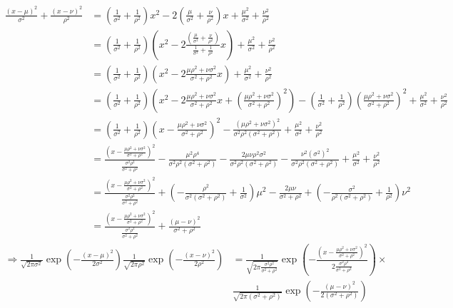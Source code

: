 \documentclass{article}
\begin{document}
\begin{pf}
\begin{align*}
\frac{(x-\mu)^2}{\sigma^2}+\frac{(x-\nu)^2}{\rho^2}&=\left(\frac{1}{\sigma^2}+\frac{1}{\rho^2}\right)x^2-2\left(\frac{\mu}{\sigma^2}+\frac{\nu}{\rho^2}\right)x+\frac{\mu^2}{\sigma^2}+\frac{\nu^2}{\rho^2}
\\&=\left(\frac{1}{\sigma^2}+\frac{1}{\rho^2}\right)\left(x^2-2\frac{\left(\frac{\mu}{\sigma^2}+\frac{\nu}{\rho^2}\right)}{\frac{1}{\sigma^2}+\frac{1}{\rho^2}}x\right)+\frac{\mu^2}{\sigma^2}+\frac{\nu^2}{\rho^2}
\\&=\left(\frac{1}{\sigma^2}+\frac{1}{\rho^2}\right)\left(x^2-2\frac{\mu\rho^2+\nu\sigma^2}{\sigma^2+\rho^2}x\right)+\frac{\mu^2}{\sigma^2}+\frac{\nu^2}{\rho^2}
\\&=\left(\frac{1}{\sigma^2}+\frac{1}{\rho^2}\right)\left(x^2-2\frac{\mu\rho^2+\nu\sigma^2}{\sigma^2+\rho^2}x+\left(\frac{\mu\rho^2+\nu\sigma^2}{\sigma^2+\rho^2}\right)^2\right)-\left(\frac{1}{\sigma^2}+\frac{1}{\rho^2}\right)\left(\frac{\mu\rho^2+\nu\sigma^2}{\sigma^2+\rho^2}\right)^2+\frac{\mu^2}{\sigma^2}+\frac{\nu^2}{\rho^2}
\\&=\left(\frac{1}{\sigma^2}+\frac{1}{\rho^2}\right)\left(x-\frac{\mu\rho^2+\nu\sigma^2}{\sigma^2+\rho^2}\right)^2-\frac{(\mu\rho^2+\nu\sigma^2)^2}{\sigma^2\rho^2(\sigma^2+\rho^2)}+\frac{\mu^2}{\sigma^2}+\frac{\nu^2}{\rho^2}
\\&=\frac{\left(x-\frac{\mu\rho^2+\nu\sigma^2}{\sigma^2+\rho^2}\right)^2}{\frac{\sigma^2\rho^2}{\sigma^2+\rho^2}}-\frac{\mu^2\rho^4}{\sigma^2\rho^2(\sigma^2+\rho^2)}-\frac{2\mu\nu\rho^2\sigma^2}{\sigma^2\rho^2(\sigma^2+\rho^2)}-\frac{\nu^2(\sigma^2)^2}{\sigma^2\rho^2(\sigma^2+\rho^2)}+\frac{\mu^2}{\sigma^2}+\frac{\nu^2}{\rho^2}
\\&=\frac{\left(x-\frac{\mu\rho^2+\nu\sigma^2}{\sigma^2+\rho^2}\right)^2}{\frac{\sigma^2\rho^2}{\sigma^2+\rho^2}}+\left(-\frac{\rho^2}{\sigma^2(\sigma^2+\rho^2)}+\frac{1}{\sigma^2}\right)\mu^2-\frac{2\mu\nu}{\sigma^2+\rho^2}+\left(-\frac{\sigma^2}{\rho^2(\sigma^2+\rho^2)}+\frac{1}{\rho^2}\right)\nu^2
\\&=\frac{\left(x-\frac{\mu\rho^2+\nu\sigma^2}{\sigma^2+\rho^2}\right)^2}{\frac{\sigma^2\rho^2}{\sigma^2+\rho^2}}+\frac{(\mu-\nu)^2}{\sigma^2+\rho^2}
\end{align*}
\begin{align*}
\Rightarrow \frac{1}{\sqrt{2\pi\sigma^2}}\exp\left(-\frac{(x-\mu)^2}{2\sigma^2}\right)\frac{1}{\sqrt{2\pi\rho^2}}\exp\left(-\frac{(x-\nu)^2}{2\rho^2}\right)&=\frac{1}{\sqrt{2\pi\frac{\sigma^2\rho^2}{\sigma^2+\rho^2}}}\exp\left(-\frac{\left(x-\frac{\mu\rho^2+\nu\sigma^2}{\sigma^2+\rho^2}\right)^2}{2\frac{\sigma^2\rho^2}{\sigma^2+\rho^2}}\right)\times
\\&\frac{1}{\sqrt{2\pi(\sigma^2+\rho^2)}}\exp\left(-\frac{(\mu-\nu)^2}{2(\sigma^2+\rho^2)}\right)
\end{align*}
\end{pf}
\end{document}

